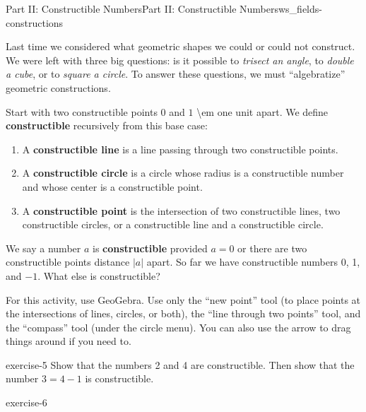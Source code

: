 \documentclass[oneside,11pt,]{article}
\newcommand{\terminology}[1]{\textbf{#1}}
\begin{document}
\begin{worksheet-section-numberless}{Part II: Constructible Numbers}{}{Part II: Constructible Numbers}{}{}{ws_fields-constructions}
\begin{introduction}{}%
\hypertarget{p-18}{}%
Last time we considered what geometric shapes we could or could not construct.  We were left with three big questions: is it possible to \emph{trisect an angle}, to \emph{double a cube}, or to \emph{square a circle}.  To answer these questions, we must ``algebratize'' geometric constructions.%
\par
\hypertarget{p-19}{}%
Start with two constructible points \(0\) and \(1\) \textbraceleft{}\textbackslash{}em one unit\textbraceright{} apart.  We define \terminology{constructible} recursively from this base case:\leavevmode%
\begin{enumerate}[label=(\alph*)]
\item\hypertarget{li-4}{}\hypertarget{p-20}{}%
A \terminology{constructible line} is a line passing through two constructible points.%
\item\hypertarget{li-5}{}\hypertarget{p-21}{}%
A \terminology{constructible circle} is a circle whose radius is a constructible number and whose center is a constructible point.%
\item\hypertarget{li-6}{}\hypertarget{p-22}{}%
A \terminology{constructible point} is the intersection of two constructible lines, two constructible circles, or a constructible line and a constructible circle.%
\end{enumerate}
%
\par
\hypertarget{p-23}{}%
We say a number \(a\) is \terminology{constructible} provided \(a = 0\) or there are two constructible points distance \(|a|\) apart.  So far we have constructible numbers 0, 1, and \(-1\).  What else is constructible?%
\par
\hypertarget{p-24}{}%
For this activity, use GeoGebra.  Use only the ``new point'' tool (to place points at the intersections of lines, circles, or both), the ``line through two points'' tool, and the ``compass'' tool (under the circle menu).  You can also use the arrow to drag things around if you need to.%
\end{introduction}%
\begin{divisionexercise}{1}{}{}{exercise-5}%
\hypertarget{p-25}{}%
Show that the numbers 2 and 4 are constructible.  Then show that the number \(3 = 4 - 1\) is constructible.%
\end{divisionexercise}%
\begin{divisionexercise}{2}{}{}{exercise-6}%

\end{divisionexercise}
\end{worksheet-section-numberless}
\end{document}
